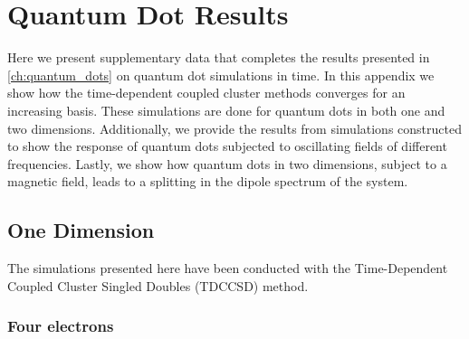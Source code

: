 \chapter{Quantum Dot Results}

Here we present supplementary data that completes the results presented in 
\autoref{ch:quantum_dots} on quantum dot simulations in time. In this appendix we 
show how the time-dependent coupled cluster methods 
converges for an increasing basis. These simulations are done for quantum dots in both
one and two dimensions.
Additionally, we provide the results from simulations constructed to show the response 
of quantum dots subjected to oscillating fields of different frequencies.
Lastly, we show how quantum dots in two
dimensions, subject to a magnetic field, leads to a splitting in the dipole spectrum 
of the system.

\vfill
\pagebreak

\section{One Dimension}
\label{app:1d_qd}

The simulations presented here have been conducted with the Time-Dependent Coupled 
Cluster Singled Doubles (TDCCSD) method.

\subsection*{Four electrons}


